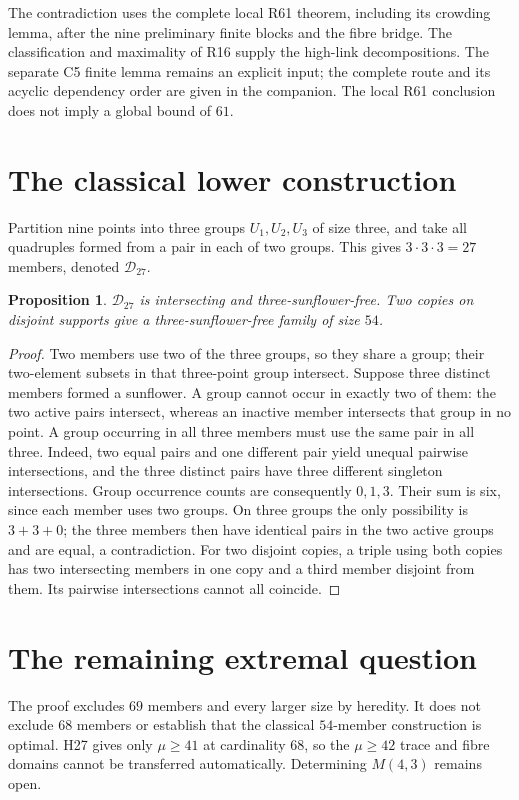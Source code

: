 \documentclass[11pt,a4paper]{article}
\numberwithin{equation}{section}
\newtheorem{proposition}[theorem]{Proposition}
\theoremstyle{remark}
\begin{document}
The contradiction uses the complete local R61 theorem, including its
crowding lemma, after the nine preliminary finite blocks and the fibre
bridge. The classification and maximality of R16 supply the high-link
decompositions. The separate C5 finite lemma remains an explicit input;
the complete route and its acyclic dependency order are given in the
companion. The local R61 conclusion does not imply a global bound of $61$.

\section{The classical lower construction}
\label{sec:lower}
Partition nine points into three groups $ U_1,U_2,U_3$ of size
three, and take all quadruples formed from a pair in each of
two groups. This gives $3\cdot 3\cdot 3=27$ members, denoted
$\mathcal D_{27}$.

\begin{proposition}
$\mathcal D_{27}$ is intersecting and three-sunflower-free.
Two copies on disjoint supports give a three-sunflower-free
family of size $54$.
\end{proposition}
\begin{proof}
Two members use two of the three groups, so they share a group;
their two-element subsets in that three-point group intersect.
Suppose three distinct members formed a sunflower. A group
cannot occur in exactly two of them: the two active pairs
intersect, whereas an inactive member intersects that group
in no point. A group occurring in all three members must use
the same pair in all three. Indeed, two equal pairs and one
different pair yield unequal pairwise intersections, and the
three distinct pairs have three different singleton
intersections. Group occurrence counts are consequently
$0,1,3$. Their sum is six, since each member uses two groups.
On three groups the only possibility is $3+3+0$; the three
members then have identical pairs in the two active groups
and are equal, a contradiction. For two disjoint copies,
a triple using both copies has two intersecting members
in one copy and a third member disjoint from them. Its
pairwise intersections cannot all coincide.
\end{proof}

\section{The remaining extremal question}
\label{sec:residual}
The proof excludes $69$ members and every larger size by heredity.
It does not exclude $68$ members or establish that the classical
$54$-member construction is optimal. H27 gives only $\mu\ge41$ at
cardinality $68$, so the $\mu\ge42$ trace and fibre domains cannot be
transferred automatically. Determining $M(4,3)$ remains open.
\end{document}
